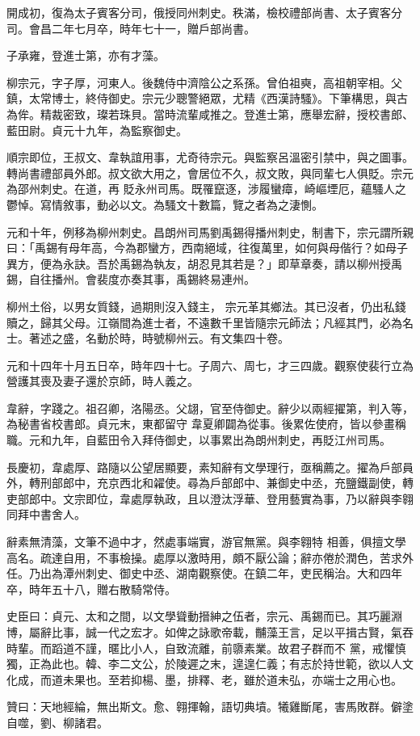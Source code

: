 \begin{pinyinscope}
 開成初，復為太子賓客分司，俄授同州刺史。秩滿，檢校禮部尚書、太子賓客分司。會昌二年七月卒，時年七十一，贈戶部尚書。



 子承雍，登進士第，亦有才藻。



 柳宗元，字子厚，河東人。後魏侍中濟陰公之系孫。曾伯祖奭，高祖朝宰相。父鎮，太常博士，終侍御史。宗元少聰警絕眾，尤精《西漢詩騷》。下筆構思，與古為侔。精裁密致，璨若珠貝。當時流輩咸推之。登進士第，應舉宏辭，授校書郎、藍田尉。貞元十九年，為監察御史。



 順宗即位，王叔文、韋執誼用事，尤奇待宗元。與監察呂溫密引禁中，與之圖事。轉尚書禮部員外郎。叔文欲大用之，會居位不久，叔文敗，與同輩七人俱貶。宗元為邵州刺史。在道，再
 貶永州司馬。既罹竄逐，涉履蠻瘴，崎嶇堙厄，蘊騷人之鬱悼。寫情敘事，動必以文。為騷文十數篇，覽之者為之淒惻。



 元和十年，例移為柳州刺史。昌朗州司馬劉禹錫得播州刺史，制書下，宗元謂所親曰：「禹錫有母年高，今為郡蠻方，西南絕域，往復萬里，如何與母偕行？如母子異方，便為永訣。吾於禹錫為執友，胡忍見其若是？」即草章奏，請以柳州授禹錫，自往播州。會裴度亦奏其事，禹錫終易連州。



 柳州土俗，以男女質錢，過期則沒入錢主，
 宗元革其鄉法。其已沒者，仍出私錢贖之，歸其父母。江嶺間為進士者，不遠數千里皆隨宗元師法；凡經其門，必為名士。著述之盛，名動於時，時號柳州云。有文集四十卷。



 元和十四年十月五日卒，時年四十七。子周六、周七，才三四歲。觀察使裴行立為營護其喪及妻子還於京師，時人義之。



 韋辭，字踐之。祖召卿，洛陽丞。父翃，官至侍御史。辭少以兩經擢第，判入等，為秘書省校書郎。貞元末，東都留守
 韋夏卿闢為從事。後累佐使府，皆以參畫稱職。元和九年，自藍田令入拜侍御史，以事累出為朗州刺史，再貶江州司馬。



 長慶初，韋處厚、路隨以公望居顯要，素知辭有文學理行，亟稱薦之。擢為戶部員外，轉刑部郎中，充京西北和糴使。尋為戶部郎中、兼御史中丞，充鹽鐵副使，轉吏部郎中。文宗即位，韋處厚執政，且以澄汰浮華、登用藝實為事，乃以辭與李翱同拜中書舍人。



 辭素無清藻，文筆不過中才，然處事端實，游官無黨。與李翱特
 相善，俱擅文學高名。疏達自用，不事檢操。處厚以激時用，頗不厭公論；辭亦倦於潤色，苦求外任。乃出為潭州刺史、御史中丞、湖南觀察使。在鎮二年，吏民稱治。大和四年卒，時年五十八，贈右散騎常侍。



 史臣曰：貞元、太和之間，以文學聳動搢紳之伍者，宗元、禹錫而已。其巧麗淵博，屬辭比事，誠一代之宏才。如俾之詠歌帝載，黼藻王言，足以平揖古賢，氣吞時輩。而蹈道不謹，暱比小人，自致流離，前隳素業。故君子群而不
 黨，戒懼慎獨，正為此也。韓、李二文公，於陵遲之末，遑遑仁義；有志於持世範，欲以人文化成，而道未果也。至若抑楊、墨，排釋、老，雖於道未弘，亦端士之用心也。



 贊曰：天地經綸，無出斯文。愈、翱揮翰，語切典墳。犧雞斷尾，害馬敗群。僻塗自噬，劉、柳諸君。



\end{pinyinscope}